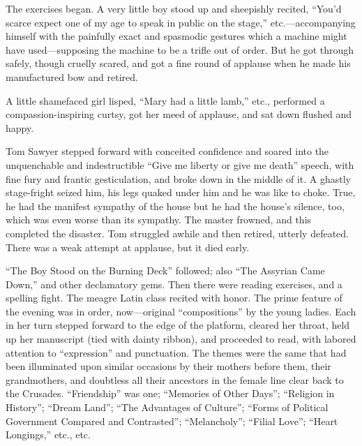 \documentclass{book}
\begin{document}
The exercises began. A very little boy stood up and sheepishly recited, “You’d scarce expect one of my age to speak in public on the stage,” etc.—accompanying himself with the painfully exact and spasmodic gestures which a machine might have used—supposing the machine to be a trifle out of order. But he got through safely, though cruelly scared, and got a fine round of applause when he made his manufactured bow and retired.

A little shamefaced girl lisped, “Mary had a little lamb,” etc., performed a compassion-inspiring curtsy, got her meed of applause, and sat down flushed and happy.

Tom Sawyer stepped forward with conceited confidence and soared into the unquenchable and indestructible “Give me liberty or give me death” speech, with fine fury and frantic gesticulation, and broke down in the middle of it. A ghastly stage-fright seized him, his legs quaked under him and he was like to choke. True, he had the manifest sympathy of the house but he had the house’s silence, too, which was even worse than its sympathy. The master frowned, and this completed the disaster. Tom struggled awhile and then retired, utterly defeated. There was a weak attempt at applause, but it died early.

“The Boy Stood on the Burning Deck” followed; also “The Assyrian Came Down,” and other declamatory gems. Then there were reading exercises, and a spelling fight. The meagre Latin class recited with honor. The prime feature of the evening was in order, now—original “compositions” by the young ladies. Each in her turn stepped forward to the edge of the platform, cleared her throat, held up her manuscript (tied with dainty ribbon), and proceeded to read, with labored attention to “expression” and punctuation. The themes were the same that had been illuminated upon similar occasions by their mothers before them, their grandmothers, and doubtless all their ancestors in the female line clear back to the Crusades. “Friendship” was one; “Memories of Other Days”; “Religion in History”; “Dream Land”; “The Advantages of Culture”; “Forms of Political Government Compared and Contrasted”; “Melancholy”; “Filial Love”; “Heart Longings,” etc., etc.
\end{document}
